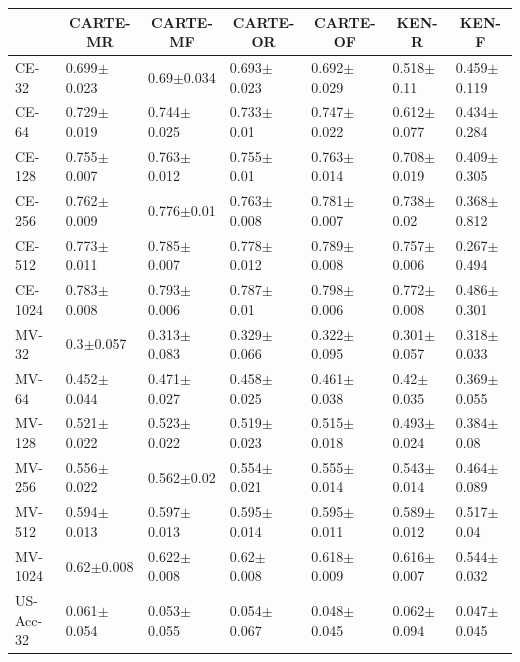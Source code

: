 \documentclass{article}
\theoremstyle{plain}
\theoremstyle{definition}
\theoremstyle{remark}
\begin{document}
\begin{table}[!h]
\begin{center}
    \begin{tabular}{lllllll}
    \toprule
    {} &       \multicolumn{1}{c}{\textbf{CARTE-MR}} &       \multicolumn{1}{c}{\textbf{CARTE-MF}} &       \multicolumn{1}{c}{\textbf{CARTE-OR}} &       \multicolumn{1}{c}{\textbf{CARTE-OF}} &         \multicolumn{1}{c}{\textbf{KEN-R}} &         \multicolumn{1}{c}{\textbf{KEN-F}} \\
    \midrule
    CE-32        &  0.699$\pm$0.023 &   0.69$\pm$0.034 &  0.693$\pm$0.023 &  0.692$\pm$0.029 &   0.518$\pm$0.11 &  0.459$\pm$0.119 \\
    CE-64        &  0.729$\pm$0.019 &  0.744$\pm$0.025 &   0.733$\pm$0.01 &  0.747$\pm$0.022 &  0.612$\pm$0.077 &  0.434$\pm$0.284 \\
    CE-128       &  0.755$\pm$0.007 &  0.763$\pm$0.012 &   0.755$\pm$0.01 &  0.763$\pm$0.014 &  0.708$\pm$0.019 &  0.409$\pm$0.305 \\
    CE-256       &  0.762$\pm$0.009 &   0.776$\pm$0.01 &  0.763$\pm$0.008 &  0.781$\pm$0.007 &   0.738$\pm$0.02 &  0.368$\pm$0.812 \\
    CE-512       &  0.773$\pm$0.011 &  0.785$\pm$0.007 &  0.778$\pm$0.012 &  0.789$\pm$0.008 &  0.757$\pm$0.006 &  0.267$\pm$0.494 \\
    CE-1024      &  0.783$\pm$0.008 &  0.793$\pm$0.006 &   0.787$\pm$0.01 &  0.798$\pm$0.006 &  0.772$\pm$0.008 &  0.486$\pm$0.301 \\
    \midrule
    MV-32        &    0.3$\pm$0.057 &  0.313$\pm$0.083 &  0.329$\pm$0.066 &  0.322$\pm$0.095 &  0.301$\pm$0.057 &  0.318$\pm$0.033 \\
    MV-64        &  0.452$\pm$0.044 &  0.471$\pm$0.027 &  0.458$\pm$0.025 &  0.461$\pm$0.038 &   0.42$\pm$0.035 &  0.369$\pm$0.055 \\
    MV-128       &  0.521$\pm$0.022 &  0.523$\pm$0.022 &  0.519$\pm$0.023 &  0.515$\pm$0.018 &  0.493$\pm$0.024 &   0.384$\pm$0.08 \\
    MV-256       &  0.556$\pm$0.022 &   0.562$\pm$0.02 &  0.554$\pm$0.021 &  0.555$\pm$0.014 &  0.543$\pm$0.014 &  0.464$\pm$0.089 \\
    MV-512       &  0.594$\pm$0.013 &  0.597$\pm$0.013 &  0.595$\pm$0.014 &  0.595$\pm$0.011 &  0.589$\pm$0.012 &   0.517$\pm$0.04 \\
    MV-1024      &   0.62$\pm$0.008 &  0.622$\pm$0.008 &   0.62$\pm$0.008 &  0.618$\pm$0.009 &  0.616$\pm$0.007 &  0.544$\pm$0.032 \\
    \midrule
    US-Acc-32    &  0.061$\pm$0.054 &  0.053$\pm$0.055 &  0.054$\pm$0.067 &  0.048$\pm$0.045 &  0.062$\pm$0.094 &  0.047$\pm$0.045 \\

\end{tabular}
\end{center}
\end{table}
\end{document}

